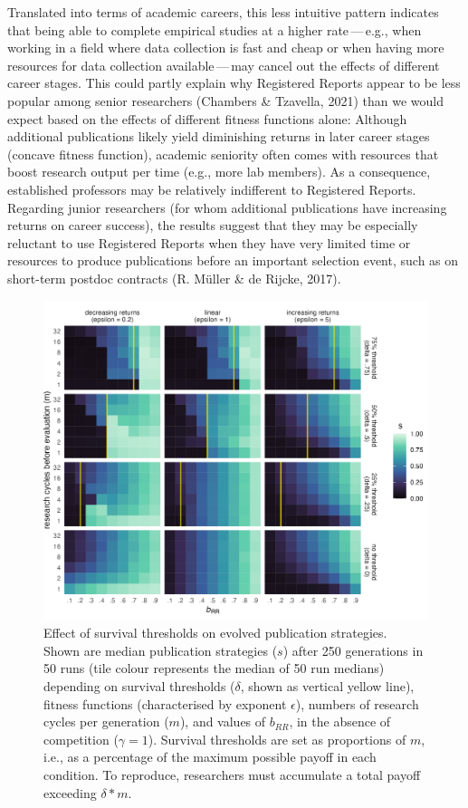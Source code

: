 \documentclass[
  ,man,mask,floatsintext]{apa6}
\begin{document}
Translated into terms of academic careers, this less intuitive pattern indicates that
being able to complete empirical studies at a higher rate\(\,\)---\(\,\)e.g., when working in a field where data collection is fast and cheap or when having more resources for data collection available\(\,\)---\(\,\)may cancel out the effects of different career stages.
This could partly explain why Registered Reports appear to be less popular among senior researchers (Chambers \& Tzavella, 2021) than we would expect based on the effects of different fitness functions alone:
Although additional publications likely yield diminishing returns in later career stages (concave fitness function), academic seniority often comes with resources that boost research output per time (e.g., more lab members).
As a consequence, established professors may be relatively indifferent to Registered Reports.
Regarding junior researchers (for whom additional publications have increasing returns on career success), the results suggest that they may be especially reluctant to use Registered Reports when they have very limited time or resources to produce publications before an important selection event, such as on short-term postdoc contracts (R. Müller \& de Rijcke, 2017).



\begin{figure}
\includegraphics[width=1\linewidth]{plots/plot_delta_tile_evo_epsilon_mako} \caption{Effect of survival thresholds on evolved publication strategies. Shown are median publication strategies (\(s\)) after 250 generations in 50 runs (tile colour represents the median of 50 run medians) depending on survival thresholds (\(\delta\), shown as vertical yellow line), fitness functions (characterised by exponent \(\epsilon\)), numbers of research cycles per generation (\(m\)), and values of \(b_{RR}\), in the absence of competition (\(\gamma = 1\)). Survival thresholds are set as proportions of \(m\), i.e., as a percentage of the maximum possible payoff in each condition. To reproduce, researchers must accumulate a total payoff exceeding \(\delta * m\).}\label{fig:deltaplot}
\end{figure}
\end{document}
